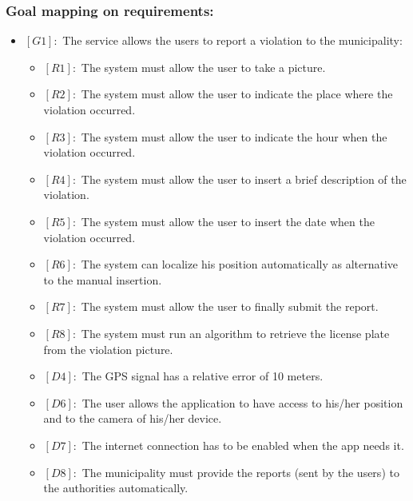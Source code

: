 \documentclass[titlepage]{article}
\begin{document}
\subsubsection{Goal mapping on requirements:}
\begin{itemize}
 \item $[G1]:$ The service allows the users to report a violation to the municipality:
 \begin{itemize}
 	\item $[R1]:$ The system must allow the user to take a picture.
 	\item $[R2]:$ The system must allow the user to indicate the place where the violation occurred.
 	\item $[R3]:$ The system must allow the user to indicate the hour when the violation occurred.
 	\item $[R4]:$ The system must allow the user to insert a brief description of the violation.
 	\item $[R5]:$ The system must allow the user to insert the date when the violation occurred.
 	\item $[R6]:$ The system can localize his position automatically as alternative to the manual insertion.
 	\item $[R7]:$ The system must allow the user to finally submit the report.
 	\item $[R8]:$ The system must run an algorithm to retrieve the license plate from the violation picture.
 	\item $[D4]:$ The GPS signal has a relative error of 10 meters.
 	\item $[D6]:$ The user allows the application to have access to his/her position and to the camera of his/her device.
 	\item $[D7]:$ The internet connection has to be enabled when the app needs it.
 	\item $[D8]:$ The municipality must provide the reports (sent by the users) to the authorities automatically.
 	

\end{itemize}
\end{itemize}
\end{document}
